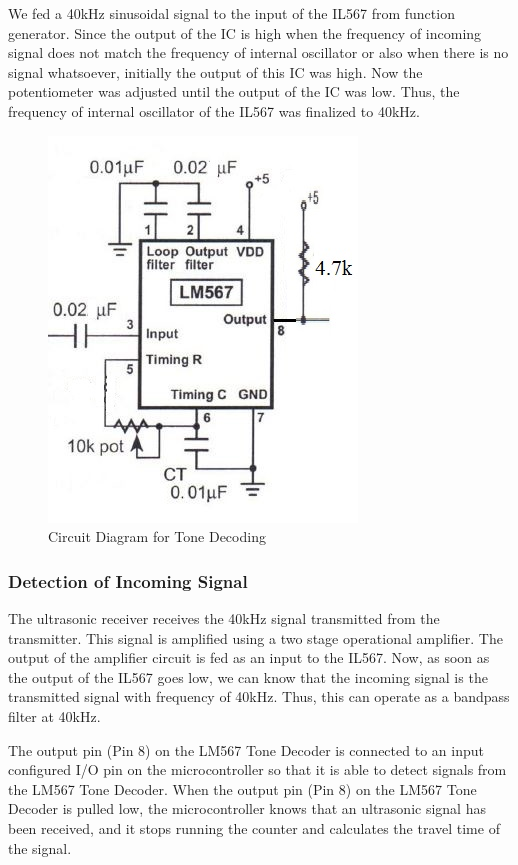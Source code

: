 We fed a 40kHz sinusoidal signal to the input of the IL567 from function generator. Since the output of the IC is high when the frequency of incoming signal does not match the frequency of internal oscillator or also when there is no signal whatsoever, initially the output of this IC was high. Now the potentiometer was adjusted until the output of the IC was low. Thus, the frequency of internal oscillator of the IL567 was finalized to 40kHz.
\begin{figure}[h]
	\centering
	\includegraphics[scale=0.7]{Images/ToneDecoder.jpg}
	\caption{Circuit Diagram for Tone Decoding}
	\label{fig:CircuitDiagramForToneDecoding}
\end{figure}

\subsubsection{Detection of Incoming Signal}
The ultrasonic receiver receives the 40kHz signal transmitted from the transmitter. This signal is amplified using a two stage operational amplifier. The output of the amplifier circuit is fed as an input to the IL567. Now, as soon as the output of the IL567 goes low, we can know that the incoming signal is the transmitted signal with frequency of 40kHz. Thus, this can operate as a bandpass filter at 40kHz.

The output pin (Pin 8) on the LM567 Tone Decoder is connected to an input configured I/O pin on the microcontroller so that it is able to detect signals from the LM567 Tone Decoder. When the output pin (Pin 8) on the LM567 Tone Decoder is pulled low, the microcontroller knows that an ultrasonic signal has been received, and it stops running the counter and calculates the travel time of the signal.


